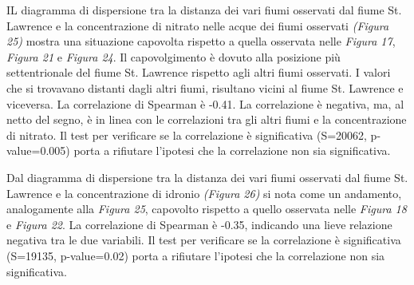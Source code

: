 \documentclass{article} %
\begin{document}
IL diagramma di dispersione tra la distanza dei vari fiumi osservati dal fiume St. Lawrence e la concentrazione di nitrato nelle acque dei fiumi osservati \textit{(Figura 25)} mostra una situazione capovolta rispetto a quella osservata nelle \textit{Figura 17}, \textit{Figura 21} e \textit{Figura 24}.
Il capovolgimento è dovuto alla posizione più settentrionale del fiume St. Lawrence rispetto agli altri fiumi osservati. I valori che si trovavano distanti dagli altri fiumi, risultano vicini al fiume St. Lawrence e viceversa. 
La correlazione di Spearman è -0.41. La correlazione è negativa, ma, al netto del segno, è in linea con le correlazioni tra gli altri fiumi e la concentrazione di nitrato.  
Il test per verificare se la correlazione è significativa (S=20062, p-value=0.005) porta a rifiutare l'ipotesi che la correlazione non sia significativa.

Dal diagramma di dispersione tra la distanza dei vari fiumi osservati dal fiume St. Lawrence e la concentrazione di idronio \textit{(Figura 26)} si nota come un andamento, analogamente alla \textit{Figura 25}, capovolto rispetto a quello osservata nelle \textit{Figura 18} e \textit{Figura 22}.
La correlazione di Spearman è -0.35, indicando una lieve relazione negativa tra le due variabili. 
Il test per verificare se la correlazione è significativa (S=19135, p-value=0.02) porta a rifiutare l'ipotesi che la correlazione non sia significativa.
\end{document}
